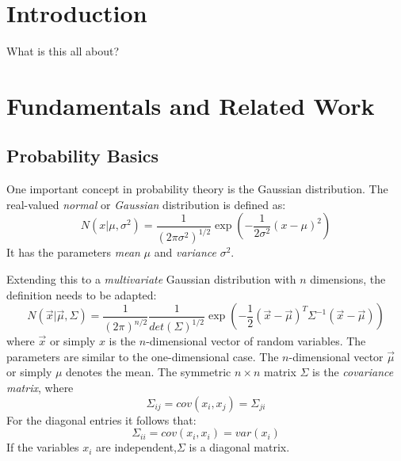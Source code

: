 \documentclass[twoside,12pt,a4paper]{report}
\begin{document}

\renewcommand{\baselinestretch}{1.3}
\small\normalsize

\tableofcontents

\renewcommand{\baselinestretch}{1}
\small\normalsize

\cleardoublepage


\setcounter{page}{1}


\chapter{Introduction}
What is this all about?


\chapter{Fundamentals and Related Work}
\section{Probability Basics}
One important concept in probability theory is the Gaussian distribution.
The real-valued \textit{normal} or \textit{Gaussian} distribution is defined as:
$$N(x | \mu, \sigma^2) = \frac{1}{(2\pi \sigma^2)^{1/2}} \exp\left(- \frac{1}{2\sigma^2} (x-\mu)^2 \right)$$
It has the parameters \textit{mean} $\mu$ and \textit{variance} $\sigma ^2$.

Extending this to a \textit{multivariate} Gaussian distribution with $n$ dimensions, the definition needs to be adapted:
$$N(\vec{x} | \vec{\mu}, \Sigma) = \frac{1}{(2\pi)^{n/2}} \frac{1}{det(\Sigma)^{1/2}} \exp\left(-\frac{1}{2} (\vec{x} - \vec{\mu})^T \Sigma ^{-1} (\vec{x} - \vec{\mu})\right)$$
where $\vec{x}$ or simply $x$ is the $n$-dimensional vector of random variables. The parameters are similar to the one-dimensional case. The $n$-dimensional vector $\vec{\mu}$ or simply $\mu$ denotes the mean. The symmetric $n \times n$ matrix $\Sigma$ is the \textit{covariance matrix}, where
$$ \Sigma_{ij} =  cov(x_i, x_j) = \Sigma_{ji}$$
For the diagonal entries it follows that:
$$\Sigma_{ii} = cov(x_i,x_i) = var(x_i)$$
If the variables $x_i$ are independent,$\Sigma$ is a diagonal matrix.
\end{document}
